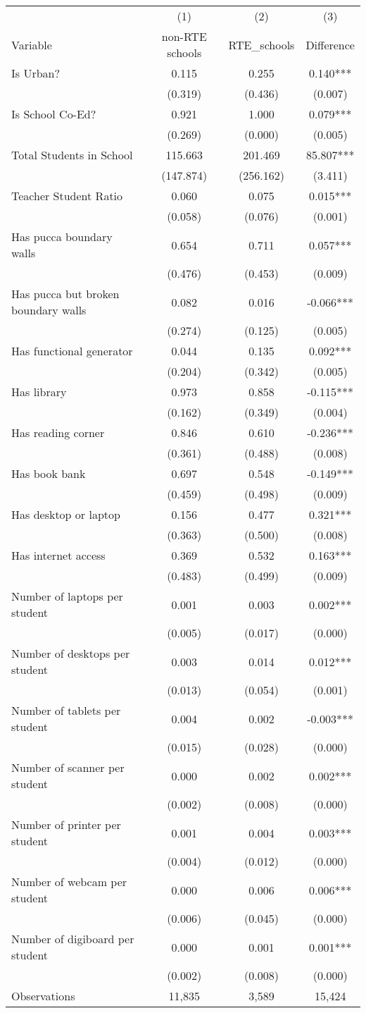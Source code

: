 \begin{tabular}{l*{3}c}
\hline\hline
 & (1) & (2) & (3) \\
Variable & non-RTE schools & RTE_schools & Difference \\
\hline
Is Urban?&0.115&0.255&0.140***\\
&(0.319)&(0.436)&(0.007)\\
Is School Co-Ed?&0.921&1.000&0.079***\\
&(0.269)&(0.000)&(0.005)\\
Total Students in School&115.663&201.469&85.807***\\
&(147.874)&(256.162)&(3.411)\\
Teacher Student Ratio&0.060&0.075&0.015***\\
&(0.058)&(0.076)&(0.001)\\
Has pucca boundary walls&0.654&0.711&0.057***\\
&(0.476)&(0.453)&(0.009)\\
Has pucca but broken boundary walls&0.082&0.016&-0.066***\\
&(0.274)&(0.125)&(0.005)\\
Has functional generator&0.044&0.135&0.092***\\
&(0.204)&(0.342)&(0.005)\\
Has library&0.973&0.858&-0.115***\\
&(0.162)&(0.349)&(0.004)\\
Has reading corner&0.846&0.610&-0.236***\\
&(0.361)&(0.488)&(0.008)\\
Has book bank&0.697&0.548&-0.149***\\
&(0.459)&(0.498)&(0.009)\\
Has desktop or laptop&0.156&0.477&0.321***\\
&(0.363)&(0.500)&(0.008)\\
Has internet access&0.369&0.532&0.163***\\
&(0.483)&(0.499)&(0.009)\\
Number of laptops per student&0.001&0.003&0.002***\\
&(0.005)&(0.017)&(0.000)\\
Number of desktops per student&0.003&0.014&0.012***\\
&(0.013)&(0.054)&(0.001)\\
Number of tablets per student&0.004&0.002&-0.003***\\
&(0.015)&(0.028)&(0.000)\\
Number of scanner per student&0.000&0.002&0.002***\\
&(0.002)&(0.008)&(0.000)\\
Number of printer per student&0.001&0.004&0.003***\\
&(0.004)&(0.012)&(0.000)\\
Number of webcam per student&0.000&0.006&0.006***\\
&(0.006)&(0.045)&(0.000)\\
Number of digiboard per student&0.000&0.001&0.001***\\
&(0.002)&(0.008)&(0.000)\\
\hline
Observations & 11,835 & 3,589 & 15,424 \\
\hline\hline
\end{tabular}
